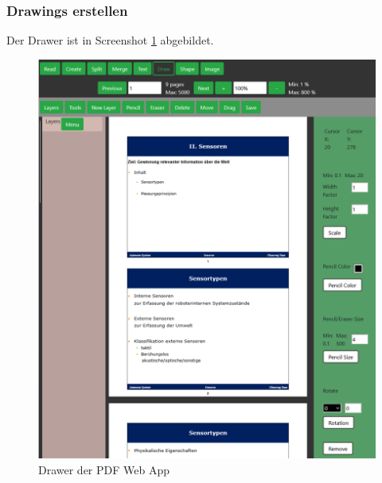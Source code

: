 \subsubsection{Drawings erstellen}
Der Drawer ist in Screenshot \ref{fig:drawer} abgebildet. 

\begin{figure}[!htbp]
	\centering
	\includegraphics[width=1\textwidth]{"images/drawer.png"}
	\caption{Drawer der PDF Web App}
	\label{fig:drawer}
\end{figure}

